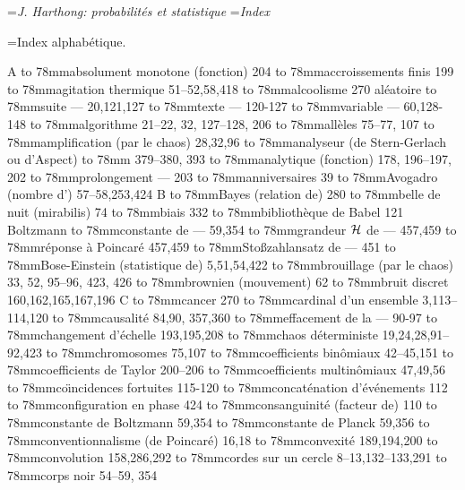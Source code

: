


\auteurcourant={\sl J. Harthong: probabilit\'es et statistique}
\titrecourant={\sl Index}
\baselineskip=15pt

\def\term#1#2{\hbox to 78mm{#1\dotfill\hskip4pt #2}} 
\def\w{\hskip15pt} 
 
 
\titre={\tit Index alphab\'etique.} 
 
\hbox{A} 
\medskip 
\term{absolument monotone (fonction)}{204} 
\term{accroissements finis}{199} 
\term{agitation thermique}{51--52,58,418} 
\term{alcoolisme}{270} 
\hbox{al\'eatoire} 
\term{\w suite ---}{20,121,127} 
\term{\w texte ---}{120-127} 
\term{\w variable ---}{60,128-148} 
\term{algorithme}{21--22, 32, 127--128, 206} 
\term{all\`eles}{75--77, 107} 
\term{amplification (par le chaos)}{28,32,96} 
\term{analyseur (de Stern-Gerlach ou d'Aspect)}{} 
\term{}{379--380, 393} 
\term{analytique (fonction)}{178, 196--197, 202} 
\term{\w prolongement ---}{203} 
\term{anniversaires}{39} 
\term{Avogadro (nombre d')}{57--58,253,424} 
\vskip8.6mm \vfill  
\hbox{B} 
\medskip 
\term{Bayes (relation de)}{280} 
\term{belle de nuit (mirabilis)}{74} 
\term{biais}{332} 
\term{biblioth\`eque de Babel}{121} 
\hbox{Boltzmann}
\term{\w constante de ---}{59,354} 
\term{\w grandeur ${\cal H}$ de ---}{457,459} 
\term{\w r\'eponse \`a Poincar\'e}{457,459} 
\term{\w Sto{\ss}zahlansatz de ---}{451} 
\term{Bose-Einstein (statistique de)}{5,51,54,422} 
\term{brouillage (par le chaos)}{33, 52, 95--96, 423, 426} 
\term{brownien (mouvement)}{62}  
\term{bruit discret}{160,162,165,167,196} 
\vskip8.6mm \vfill  
\hbox{C} 
\medskip 
\term{cancer}{270} 
\term{cardinal d'un ensemble}{3,113--114,120} 
\term{causalit\'e }{84,90, 357,360} 
\term{\w effacement de la ---}{90-97} 
\term{changement d'\'echelle}{193,195,208} 
\term{chaos d\'eterministe}{19,24,28,91--92,423} 
\term{chromosomes}{75,107} 
\term{coefficients bin\^omiaux}{42--45,151} 
\term{coefficients de Taylor}{200--206} 
\term{coefficients multin\^omiaux}{47,49,56} 
\term{co{\"\i}ncidences fortuites}{115-120} 
\term{concat\'enation d'\'ev\'enements}{112} 
\term{configuration en phase}{424} 
\term{consanguinit\'e (facteur de)}{110} 
\term{constante de Boltzmann}{59,354} 
\term{constante de Planck}{59,356} 
\term{conventionnalisme (de Poincar\'e)}{16,18} 
\term{convexit\'e}{189,194,200} 
\term{convolution}{158,286,292} 
\term{cordes sur un cercle}{8--13,132--133,291} 
\term{corps noir}{54--59, 354} 
\smallskip 
